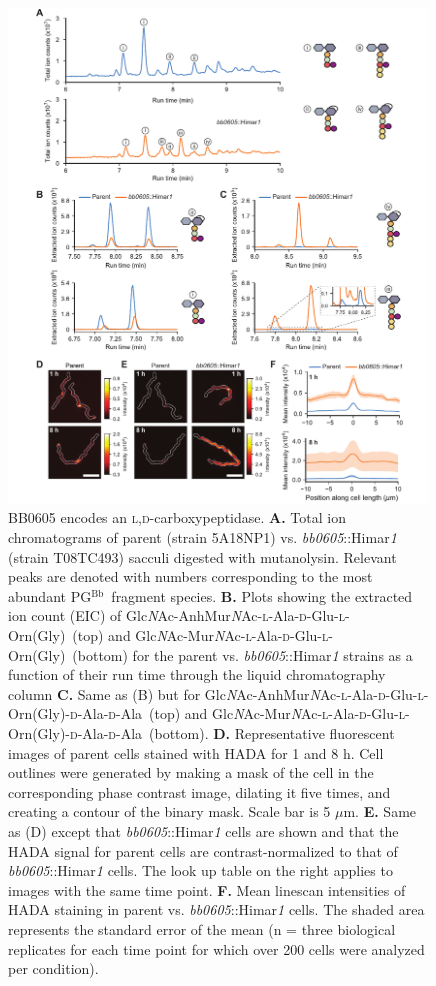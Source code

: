 \documentclass[twoside, watermark]{zHenriquesLab-StyleBioRxiv}
\newcommand{\tmu}{$\mu$} %
\newcommand{\pgbb}{PG$^\text{Bb}$}
\newcommand{\ZAEOG}{Glc\textit{N}Ac-AnhMur\textit{N}Ac-\textsc{l}-Ala-\textsc{d}-Glu-\textsc{l}-Orn(Gly)}
\newcommand{\ZAEOAAG}{Glc\textit{N}Ac-AnhMur\textit{N}Ac-\textsc{l}-Ala-\textsc{d}-Glu-\textsc{l}-Orn(Gly)-\textsc{d}-Ala-\textsc{d}-Ala}
\newcommand{\AEOAAG}{\textsc{l}-Ala-\textsc{d}-Glu-\textsc{l}-Orn(Gly)-\textsc{d}-Ala-\textsc{d}-Ala}
\newcommand{\AEOG}{\textsc{l}-Ala-\textsc{d}-Glu-\textsc{l}-Orn(Gly)}
\newcommand{\NAM}{Mur\textit{N}Ac}
\newcommand{\NAG}{Glc\textit{N}Ac}
\newcommand{\scl}{\textsc{l}} %
\newcommand{\scd}{\textsc{d}} %
\begin{document}
\begin{figure}
    \centering
    \includegraphics[width=0.99\textwidth]{Figures/Figure_3_Pentapeps_Exist_in_Bb_PG_and_Enriched_Midcell.pdf}
    \caption{BB0605 encodes an \scl,\scd-carboxypeptidase. \textbf{A.} Total ion chromatograms of parent (strain 5A18NP1) vs. \textit{bb0605}::Himar\textit{1} (strain T08TC493) sacculi digested with mutanolysin. Relevant peaks are denoted with numbers corresponding to the most abundant \pgbb~fragment species. \textbf{B.} Plots showing the extracted ion count (EIC) of \ZAEOG~(top) and \NAG-\NAM-\AEOG~(bottom) for the parent vs. \textit{bb0605}::Himar\textit{1} strains as a function of their run time through the liquid chromatography column \textbf{C.} Same as (B) but for \ZAEOAAG~(top) and \NAG-\NAM-\AEOAAG~(bottom). \textbf{D.} Representative fluorescent images of parent cells stained with HADA for 1 and 8 h. Cell outlines were generated by making a mask of the cell in the corresponding phase contrast image, dilating it five times, and creating a contour of the binary mask. Scale bar is 5 \tmu m. \textbf{E.} Same as (D) except that \textit{bb0605}::Himar\textit{1} cells are shown and that the HADA signal for parent cells are contrast-normalized to that of \textit{bb0605}::Himar\textit{1} cells. The look up table on the right applies to images with the same time point. \textbf{F.} Mean linescan intensities of HADA staining in parent vs. \textit{bb0605}::Himar\textit{1} cells. The shaded area represents the standard error of the mean (n = three biological replicates for each time point for which over 200 cells were analyzed per condition).}
    \label{fig: fig3}
\end{figure}
\end{document}
